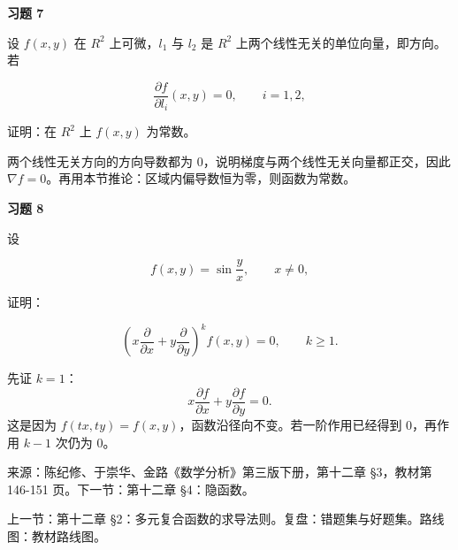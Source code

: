 \begin{exercisebox}
\textbf{习题 7}

设 \(f(x,y)\) 在 \(R^2\) 上可微，\(l_1\) 与 \(l_2\) 是 \(R^2\) 上两个线性无关的单位向量，即方向。若

\[
        \frac{\partial f}{\partial l_i}(x,y)=0,\qquad i=1,2,
      \]

证明：在 \(R^2\) 上 \(f(x,y)\) 为常数。

\begin{hintbox}
两个线性无关方向的方向导数都为 \(0\)，说明梯度与两个线性无关向量都正交，因此 \(\nabla f=0\)。再用本节推论：区域内偏导数恒为零，则函数为常数。
\end{hintbox}
\end{exercisebox}

\begin{exercisebox}
\textbf{习题 8}

设

\[
        f(x,y)=\sin\frac{y}{x},\qquad x\ne0,
      \]

证明：

\[
        \left(
        x\frac{\partial}{\partial x}
        +
        y\frac{\partial}{\partial y}
        \right)^k
        f(x,y)=0,\qquad k\ge1.
      \]

\begin{hintbox}
先证 \(k=1\)： \[
          x\frac{\partial f}{\partial x}+y\frac{\partial f}{\partial y}=0.
        \] 这是因为 \(f(tx,ty)=f(x,y)\)，函数沿径向不变。若一阶作用已经得到 \(0\)，再作用 \(k-1\) 次仍为 \(0\)。
\end{hintbox}
\end{exercisebox}

来源：陈纪修、于崇华、金路《数学分析》第三版下册，第十二章 §3，教材第 146-151 页。下一节：第十二章 §4：隐函数。

上一节：第十二章 §2：多元复合函数的求导法则。复盘：错题集与好题集。路线图：教材路线图。
